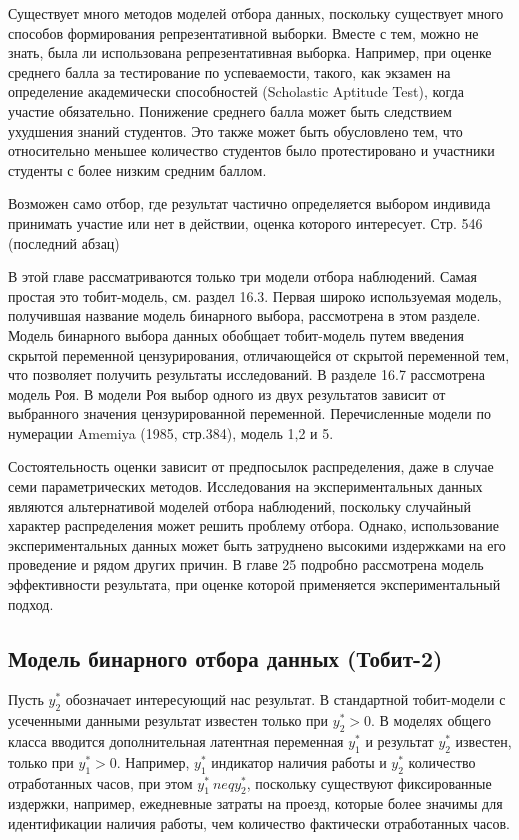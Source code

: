 Существует много методов моделей отбора данных, поскольку существует много способов формирования репрезентативной выборки. Вместе с тем, можно не знать, была ли использована репрезентативная выборка. Например, при оценке среднего балла за тестирование по успеваемости, такого, как экзамен на определение академически способностей (Scholastic Aptitude Test), когда участие обязательно. Понижение среднего балла может быть следствием ухудшения знаний студентов. Это также может быть обусловлено тем, что относительно меньшее количество студентов было протестировано и участники студенты с более низким средним баллом.

Возможен само отбор, где результат частично определяется выбором индивида принимать участие или нет в действии, оценка которого интересует. 
Стр. 546 (последний абзац)


В этой главе рассматриваются только три модели отбора наблюдений. Самая простая это тобит-модель, см. раздел 16.3. Первая широко используемая модель, получившая название модель бинарного выбора, рассмотрена в этом разделе. Модель бинарного выбора данных обобщает тобит-модель путем введения скрытой переменной цензурирования, отличающейся от скрытой переменной тем, что позволяет получить результаты исследований. В разделе 16.7 рассмотрена модель Роя. В модели Роя выбор одного из двух результатов зависит от выбранного значения цензурированной переменной. Перечисленные модели по нумерации Amemiya (1985, стр.384), модель 1,2 и 5.


Состоятельность оценки зависит от предпосылок распределения, даже в случае семи параметрических методов. Исследования на экспериментальных данных являются альтернативой моделей отбора наблюдений, поскольку случайный характер распределения может решить проблему отбора. Однако, использование экспериментальных данных может быть затруднено высокими издержками на его проведение и рядом других причин. В главе 25 подробно рассмотрена модель эффективности результата, при оценке которой применяется экспериментальный подход.


\subsection{Модель бинарного отбора данных (Тобит-2)}


Пусть $y^{*}_{2}$ обозначает интересующий нас результат. В стандартной тобит-модели с усеченными данными результат известен только при $y^{*}_{2}>0$. В моделях общего класса вводится дополнительная латентная переменная $y^{*}_1$ и результат $y^{*}_2$ известен, только при $y^{*}_{1}>0$. Например, $y^{*}_1$ индикатор наличия работы и $y^{*}_2$ количество отработанных часов, при этом $y^{*}_1{\ neq}y^{*}_2$, поскольку существуют фиксированные издержки, например, ежедневные затраты на проезд, которые более значимы для идентификации наличия работы, чем количество фактически отработанных часов.

